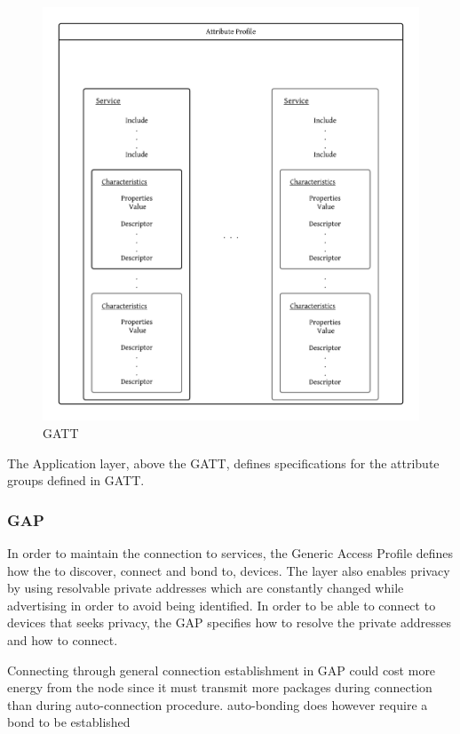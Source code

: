 \documentclass{article}
\begin{document}

\begin{figure}[p]
	\centering
	\includegraphics[scale=0.2]{gatt}
	\caption{GATT}
    \label{fig:gatt}
\end{figure}

The Application layer, above the GATT, defines specifications for the attribute groups defined in GATT.

\subsubsection{GAP}
In order to maintain the connection to services, the Generic Access Profile defines how the to discover, connect and bond to, devices. The layer also enables privacy by using resolvable private addresses which are constantly changed while advertising in order to avoid being identified. In order to be able to connect to devices that seeks privacy, the GAP specifies how to resolve the private addresses and how to connect.

Connecting through general connection establishment in GAP could cost more energy from the node since it must transmit more packages during connection than during auto-connection procedure. auto-bonding does however require a bond to be established
\end{document}
